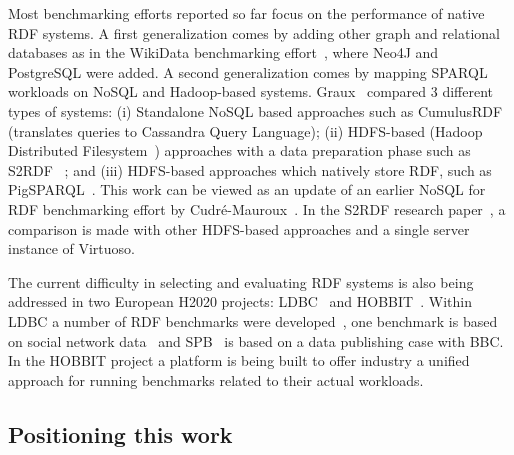 Most benchmarking efforts reported so far focus on the performance of native RDF systems. A first generalization comes by adding other graph and relational databases as in the WikiData benchmarking effort~\cite{hernandez2016querying}, where Neo4J and PostgreSQL were added. A second generalization comes by mapping SPARQL workloads on NoSQL and Hadoop-based systems. Graux~\cite{graux2016multi} compared 3 different types of systems: (i) Standalone NoSQL based approaches such as CumulusRDF~\cite{ladwig2011cumulusrdf} (translates queries to Cassandra Query Language); (ii) HDFS-based (Hadoop Distributed Filesystem~\cite{ghemawat2003google}) approaches with a data preparation phase such as S2RDF~\cite{Schatzle:2016:SRQ:2977797.2977806} ; and (iii) HDFS-based approaches which natively store RDF, such as PigSPARQL~\cite{schatzle2011pigsparql}. This work can be viewed as an update of an earlier NoSQL for RDF benchmarking effort by Cudr{\'e}-Mauroux~\cite{cudre2013nosql}. 
In the S2RDF research paper~\cite{Schatzle:2016:SRQ:2977797.2977806}, a comparison is made with other HDFS-based approaches and a single server instance of Virtuoso.

The current difficulty in selecting and evaluating RDF systems is also being addressed in two European H2020 projects: LDBC~\cite{LDBC} and 
HOBBIT~\cite{HOBBIT}. Within LDBC a number of RDF benchmarks were developed~\cite{Boncz:2013:LBG:2513591.2527070}, one benchmark is based on social network data~\cite{erling2015ldbc} and SPB~\cite{kotsevbenchmarking} is based on a data publishing case with BBC. 
In the HOBBIT project a platform is being built to offer industry a unified approach for running benchmarks related to their actual workloads.

\subsection{Positioning this work}

